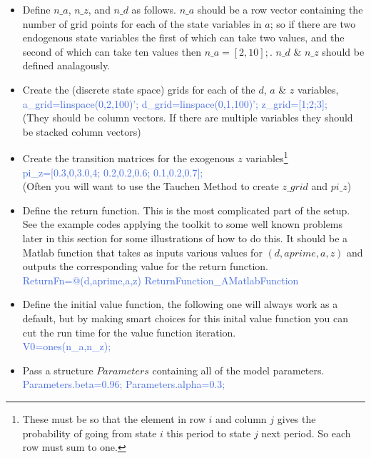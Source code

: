 \begin{itemize}
 \item Define $n\_{}a$, $n\_{}z$, and $n\_{}d$ as follows. $n\_{}a$ should be a row vector containing the number of grid points for each of the state variables in $a$;
     so if there are two endogenous state variables the first of which can take two values, and the second of which can take ten values then $n\_{}a=[2,10];$.
     $n\_{}d$ \& $n\_{}z$ should be defined analagously.
 \item Create the (discrete state space) grids for each of the $d$, $a$ \& $z$ variables, \\
    \textcolor{RoyalBlue}{a\_{}grid=linspace(0,2,100)'; d\_{}grid=linspace(0,1,100)'; z\_{}grid=[1;2;3];} \\
       (They should be column vectors. If there are multiple variables they should be stacked column vectors)
 \item Create the transition matrices for the exogenous $z$ variables\footnote{These must be so that the element in row $i$ and column
     $j$ gives the probability of going from state $i$ this period to state $j$ next period. So each row must sum to one.} \\
     \textcolor{RoyalBlue}{pi\_{}z=[0.3,0,3.0,4; 0.2,0.2,0.6; 0.1,0.2,0.7];} \\
     (Often you will want to use the Tauchen Method to create $z\_{}grid$ and $pi\_{}z$)
 \item Define the return function. This is the most complicated part of the setup. See the example codes applying the toolkit to some well known problems
     later in this section for some illustrations of how to do this. It should be a Matlab function that takes as inputs various values for $(d,aprime,a,z)$
     and outputs the corresponding value for the return function.\\
     \textcolor{RoyalBlue}{ReturnFn=@(d,aprime,a,z) ReturnFunction\_{}AMatlabFunction}
 \item Define the initial value function, the following one will always work as a default, but by making smart choices for this inital value function you can
     cut the run time for the value function iteration. \\
     \textcolor{RoyalBlue}{V0=ones(n\_{}a,n\_{}z);}
 \item Pass a structure $Parameters$ containing all of the model parameters. \\
     \textcolor{RoyalBlue}{Parameters.beta=0.96; Parameters.alpha=0.3;} \\

\end{itemize}
